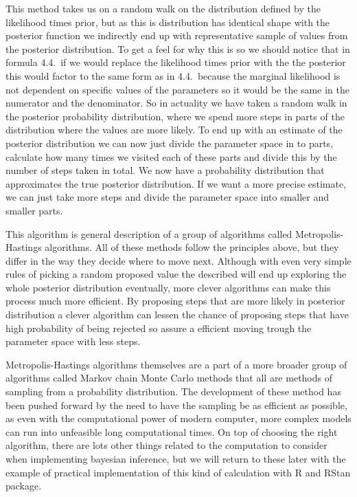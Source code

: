 \documentclass[12pt,a4paper,leqno]{report}
\theoremstyle{plain}
\theoremstyle{definition}
\theoremstyle{remark}
\begin{document}
This method takes us on a random walk on the distribution defined by the likelihood times prior,
but as this is distribution has identical shape with the posterior function we indirectly end up with
representative sample of values from the posterior distribution. To get a feel for why this is so
we should notice that in formula 4.4.\ if we would replace the likelihood times prior with the the posterior
this would factor to the same form as in 4.4.\ because the marginal likelihood is not dependent on specific values
of the parameters so it would be the same in the numerator and the denominator. So in actuality we have
taken a random walk in the posterior probability distribution, where we spend more steps in parts
of the distribution where the values are more likely. To end up with an estimate of the posterior
distribution we can now just divide the parameter space in to parts, calculate how many times
we visited each of these parts and divide this by the number of steps taken in total. We now have
a probability distribution that approximates the true posterior distribution.
If we want a more precise estimate, we can just take more steps and divide the parameter
space into smaller and smaller parts.

This algorithm is general description of a group of algorithms called Metropolis-Hastings algorithms.
All of these methods follow the principles above, but they differ in the way they decide
where to move next. Although with even very simple rules of picking a random proposed value
the described will end up exploring the whole posterior distribution eventually, more clever algorithms
can make this process much more efficient. By proposing steps that are more likely in posterior distribution
a clever algorithm can lessen the chance of proposing steps that have high probability of
being rejected so assure a efficient moving trough the parameter space with less steps.

Metropolis-Hastings algorithms themselves are a part of a more broader group of algorithms called Markov chain Monte Carlo
methods that all are methods of sampling from a probability distribution. The development of these method
has been pushed forward by the need to have the sampling be as efficient as possible, as even
with the computational power of modern computer, more complex models can run into unfeasible
long computational times. On top of choosing the right algorithm, there are lots other things related
to the computation to consider when implementing bayesian inference, but we will return to these later with
the example of practical implementation of this kind of calculation with R and RStan package.
\end{document}
